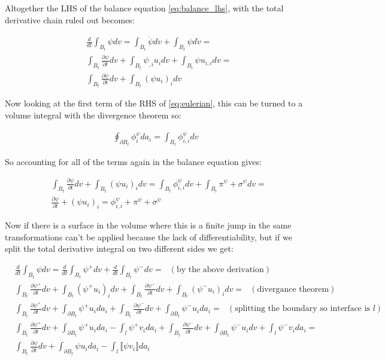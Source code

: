 \documentclass[a4paper,12pt]{article}
\newcommand{\pd}[2]{\frac{\partial #1}{\partial #2}}
\begin{document}
Altogether the LHS of the balance equation \eqref{eq:balance_lhs}, with the total derivative chain ruled out becomes:

\begin{align}
  &\frac{d}{dt} \int_{B_t} \psi dv = \int_{B_t} \dot{\psi} dv + \int_{B_t} \psi d\dot{v} =\\
  &\int_{B_t} \pd{\psi}{t}dv + \int_{B_t}\psi_{,i}u_i dv + \int_{B_t} \psi u_{i,i} dv = \\
  &\int_{B_t} \pd{\psi}{t}dv + \int_{B_t}(\psi u_i)_{i} dv \label{eq:transport-theorem}
\end{align}

Now looking at the first term of the RHS of \eqref{eq:eulerian}, this can be turned to a volume integral with the divergence theorem so:

\begin{align}
\oint_{\partial B_t} \phi_i^\psi da_i = \int_{B_t} \phi_{i,i}^\psi dv
\end{align}

So accounting for all of the terms again in the balance equation gives:

\begin{align}
  &\int_{B_t} \pd{\psi}{t}dv + \int_{B_t}(\psi u_i)_{i} dv = \int_{B_t} \phi_{i,i}^\psi dv + \int_{B_t} \pi^\psi + \sigma^\psi dv =\\
  &\pd{\psi}{t} + (\psi u_i)_{i} = \phi_{i,i}^\psi + \pi^\psi + \sigma^\psi
\end{align}

Now if there is a surface in the volume where this is a finite jump in the same transformations can't be applied because the lack of differentiability, but if we split the total derivative integral on two different sides we get:

\begin{align*}
  &\frac{d}{dt} \int_{B_t} \psi dv = \frac{d}{dt} \int_{B_t} \psi^+ dv + \frac{d}{dt} \int_{B_t} \psi^- dv = ~~~ (\text{by the above derivation})\\
  &\int_{B_t} \pd{\psi^+}{t}dv + \int_{B_t}(\psi^+ u_i)_{i} dv +  \int_{B_t} \pd{\psi^-}{t}dv + \int_{B_t}(\psi^- u_i)_{i} dv = ~~~ (\text{divergance theorem})
 \\
  &\int_{B_t} \pd{\psi^+}{t}dv + \int_{\partial B_t}\psi^+ u_i da_i +  \int_{B_t} \pd{\psi^-}{t}dv + \int_{\partial B_t}\psi^- u_i da_i = ~~~ (\text{splitting the boundary so interface is }l)\\
  &\int_{B_t} \pd{\psi^+}{t}dv + \int_{\partial B_t}\psi^+ u_i da_i - \int_{l}\psi^+ v_i da_i +  \int_{B_t} \pd{\psi^-}{t}dv + \int_{\partial B_t}\psi^- u_i dv + \int_{l}\psi^- v_i da_i =\\
  &\int_{B_t} \pd{\psi}{t}dv + \int_{\partial B_t}\psi u_i da_i - \int_{l}\llbracket\psi v_i\rrbracket da_i
\end{align*}
\end{document}
